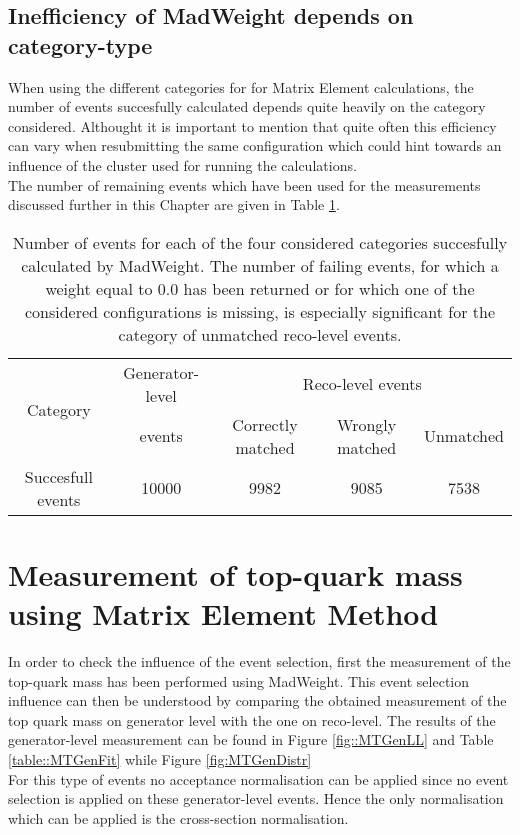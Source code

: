 \subsection{Inefficiency of MadWeight depends on category-type}
When using the different categories for for Matrix Element calculations, the number of events succesfully calculated depends quite heavily on the category considered. Althought it is important to mention that quite often this efficiency can vary when resubmitting the same configuration which could hint towards an influence of the cluster used for running the calculations.\\
The number of remaining events which have been used for the measurements discussed further in this Chapter are given in Table \ref{table::MWEff}.

\begin{table}[h!t]
 \caption{Number of events for each of the four considered categories succesfully calculated by MadWeight. The number of failing events, for which a weight equal to $0.0$ has been returned or for which one of the considered configurations is missing, is especially significant for the category of unmatched reco-level events.}
 \label{table::MWEff}
 \begin{tabular}{c|c|c|c|c}
  \multirow{2}{*}{Category}	& Generator-level 	& \multicolumn{3}{|c}{Reco-level events} 			\\
				& events 		& Correctly matched	& Wrongly matched 	& Unmatched 	\\
  \hline
  Succesfull events 		& 10000 		& 9982 			& 9085			& 7538 		
 \end{tabular}
\end{table}

\section{Measurement of top-quark mass using Matrix Element Method}
In order to check the influence of the event selection, first the measurement of the top-quark mass has been performed using MadWeight.
This event selection influence can then be understood by comparing the obtained measurement of the top quark mass on generator level with the one on reco-level.
The results of the generator-level measurement can be found in Figure \ref{fig::MTGenLL} and Table \ref{table::MTGenFit} while Figure \ref{fig:MTGenDistr}\\
For this type of events no acceptance normalisation can be applied since no event selection is applied on these generator-level events. Hence the only normalisation which can be applied is the cross-section normalisation.

